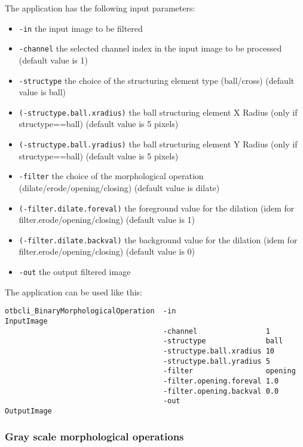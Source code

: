 The  application has the following input parameters:
\begin{itemize}
\item \verb?-in? the input image to be filtered
\item \verb?-channel? the selected channel index in the input image to be processed (default value is 1)
\item \verb?-structype? the choice of the structuring element type (ball/cross) (default value is ball)
\item \verb?(-structype.ball.xradius)? the ball structuring element X Radius (only if structype==ball) (default value is 5 pixels)
\item \verb?(-structype.ball.yradius)? the ball structuring element Y Radius (only if structype==ball) (default value is 5 pixels)
\item \verb?-filter? the choice of the morphological operation (dilate/erode/opening/closing) (default value is dilate)
\item \verb?(-filter.dilate.foreval)? the foreground value for the dilation (idem for filter.erode/opening/closing) (default value is 1)
\item \verb?(-filter.dilate.backval)? the background value for the dilation (idem for filter.erode/opening/closing) (default value is 0)
\item \verb?-out? the output filtered image
\end{itemize}


The application can be used like this:
\begin{verbatim}
otbcli_BinaryMorphologicalOperation  -in                     InputImage
                                     -channel                1
                                     -structype              ball
                                     -structype.ball.xradius 10
                                     -structype.ball.yradius 5
                                     -filter                 opening
                                     -filter.opening.foreval 1.0
                                     -filter.opening.backval 0.0
                                     -out                    OutputImage
\end{verbatim}





\subsubsection{Gray scale morphological operations}


